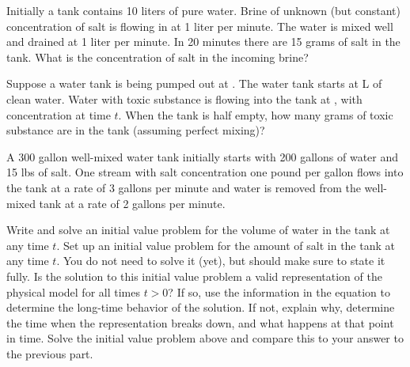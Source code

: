 \begin{exercise}
Initially a tank contains 10 liters of pure water.
Brine of unknown (but constant) concentration
of salt is flowing in at 1 liter per minute.
The water is mixed well and drained at 1 liter per minute.
In 20 minutes there are 15 grams of salt in the tank.  What is the
concentration of salt in the incoming brine?
\end{exercise}

\begin{exercise}\ansMark%
Suppose a water tank is being pumped out at .  The
water tank starts at \unit[10]{L} of clean water.
Water with
toxic substance is flowing into the tank at ,
with concentration  at time $t$.
When the tank is half empty, how many grams of toxic substance are in the
tank (assuming perfect mixing)?
\end{exercise}

\begin{exercise}
A 300 gallon well-mixed water tank initially starts with 200 gallons of water and 15 lbs of salt. One stream with salt concentration one pound per gallon flows into the tank at a rate of 3 gallons per minute and water is removed from the well-mixed tank at a rate of 2 gallons per minute.
\begin{tasks}
\task Write and solve an initial value problem for the volume of water in the tank at any time $t$.
\task Set up an initial value problem for the amount of salt in the tank at any time $t$. You do not need to solve it (yet), but should make sure to state it fully.
\task Is the solution to this initial value problem a valid representation of the physical model for all times $t > 0$? If so, use the information in the equation to determine the long-time behavior of the solution. If not, explain why, determine the time when the representation breaks down, and what happens at that point in time.
\task Solve the initial value problem above and compare this to your answer to the previous part.
\end{tasks}
\end{exercise}

